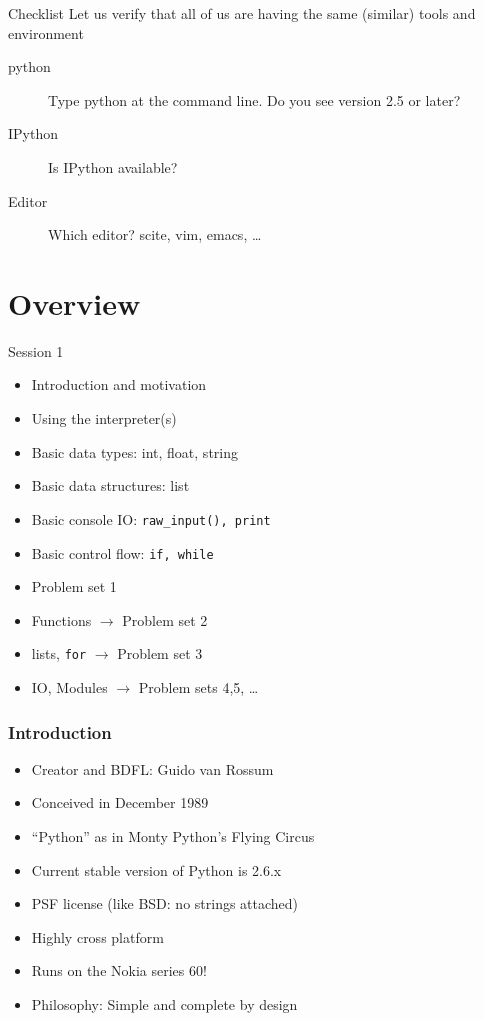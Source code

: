 \documentclass[14pt,compress]{beamer}
\begin{document}
\begin{frame}{Checklist}
  Let us verify that all of us are having the same (similar) tools and environment
  \begin{description}
	\item[python] Type python at the command line. Do you see version 2.5 or later?
	\item[IPython] Is IPython available?
	\item[Editor] Which editor? scite, vim, emacs, \ldots
  \end{description}
\end{frame}

\section{Overview}
\begin{frame}{Session 1}
  \begin{itemize}
	\item Introduction and motivation
	\item Using the interpreter(s)
	\item Basic data types: int, float, string
	\item Basic data structures: list
	\item Basic console IO: \texttt{raw\_input(), print}
    \item Basic control flow: \texttt{if, while}
	\item Problem set 1
    \item Functions $\rightarrow$ Problem set 2
    \item lists, \texttt{for}  $\rightarrow$ Problem set 3
    \item IO, Modules $\rightarrow$ Problem sets 4,5, \ldots
  \end{itemize}
\end{frame}

\begin{frame}
  \frametitle{Introduction}
  \begin{itemize}
  \item Creator and BDFL: Guido van Rossum
  \item Conceived in December 1989
  \item ``Python'' as in Monty Python's Flying Circus
  \item Current stable version of Python is 2.6.x
  \item PSF license (like BSD: no strings attached)
  \item Highly cross platform
  \item Runs on the Nokia series 60!
  \item \alert{Philosophy:} Simple and complete by design
  \end{itemize}
\end{frame}
\end{document}
